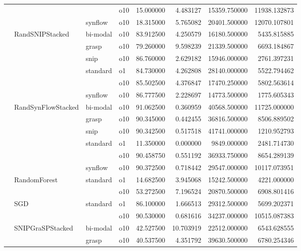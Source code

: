 \begin{longtable}{llllrrrr}
      &     &         & o10 &  15.000000 &   4.483127 &     15359.750000 &  11938.132873 \\
      &     & synflow & o10 &  18.315000 &   5.765082 &     20401.500000 &  12070.107801 \\
      & RandSNIPStacked & bi-modal & o10 &  83.912500 &   4.250579 &     16180.500000 &   5435.815885 \\
      &     & grasp & o10 &  79.260000 &   9.598239 &     21339.500000 &   6693.184867 \\
      &     & snip & o10 &  86.760000 &   2.629182 &     15946.000000 &   2761.397231 \\
      &     & standard & o1 &  84.730000 &   4.262808 &     28140.000000 &   5522.794462 \\
      &     &         & o10 &  85.502500 &   4.376847 &     17470.250000 &   5802.563614 \\
      &     & synflow & o10 &  86.777500 &   2.228697 &     14773.500000 &   1775.605343 \\
      & RandSynFlowStacked & bi-modal & o10 &  91.062500 &   0.360959 &     40568.500000 &  11725.000000 \\
      &     & grasp & o10 &  90.345000 &   0.442455 &     36816.500000 &   8506.889502 \\
      &     & snip & o10 &  90.342500 &   0.517518 &     41741.000000 &   1210.952793 \\
      &     & standard & o1 &  11.350000 &   0.000000 &      9849.000000 &   2481.714730 \\
      &     &         & o10 &  90.458750 &   0.551192 &     36933.750000 &   8654.289139 \\
      &     & synflow & o10 &  90.372500 &   0.718442 &     29547.000000 &  10117.073951 \\
      & RandomForest & standard & o1 &  14.682500 &   3.945068 &     15242.500000 &   4221.000000 \\
      &     &         & o10 &  53.272500 &   7.196524 &     20870.500000 &   6908.801416 \\
      & SGD & standard & o1 &  86.100000 &   1.666513 &     29312.500000 &   5699.202371 \\
      &     &         & o10 &  90.530000 &   0.681616 &     34237.000000 &  10515.087383 \\
      & SNIPGraSPStacked & bi-modal & o10 &  42.527500 &  10.703919 &     22512.000000 &   6543.628555 \\
      &     & grasp & o10 &  40.537500 &   4.351792 &     39630.500000 &   6780.254346 \\

\end{longtable}
